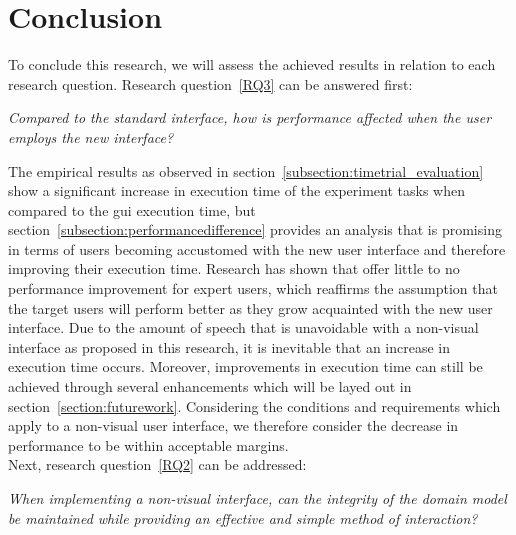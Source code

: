 \chapter{Conclusion}
\label{chapter:conclusion}
To conclude this research, we will assess the achieved results in relation to each research question. Research question~\ref{RQ3} can be answered first:

\begin{displayquote}
	\textit{Compared to the standard interface, how is performance affected when the user employs the new interface?}
\end{displayquote}

The empirical results as observed in section~\ref{subsection:timetrial_evaluation} show a significant increase in execution time of the experiment tasks when compared to the \acrshort{gui} execution time, but section~\ref{subsection:performancedifference} provides an analysis that is promising in terms of users becoming accustomed with the new user interface and therefore improving their execution time. Research has shown that  offer little to no performance improvement for expert users\cite{chen2007comparing}, which reaffirms the assumption that the target users will perform better as they grow acquainted with the new user interface. Due to the amount of speech that is unavoidable with a non-visual interface as proposed in this research, it is inevitable that an increase in execution time occurs. Moreover, improvements in execution time can still be achieved through several enhancements which will be layed out in section~\ref{section:futurework}. Considering the conditions and requirements which apply to a non-visual user interface, we therefore consider the decrease in performance to be within acceptable margins.\\
\newline
\noindent Next, research question~\ref{RQ2} can be addressed:

\begin{displayquote}
	\textit{When implementing a non-visual interface, can the integrity of the domain model be maintained while providing an effective and simple method of interaction?}
\end{displayquote}


